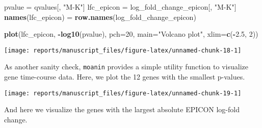 \documentclass[9pt,a4paper,]{extarticle}
\newenvironment{Shaded}{\begin{snugshade}}{\end{snugshade}}
\newcommand{\DataTypeTok}[1]{\textcolor[rgb]{0.13,0.29,0.53}{#1}}
\newcommand{\DecValTok}[1]{\textcolor[rgb]{0.00,0.00,0.81}{#1}}
\newcommand{\FloatTok}[1]{\textcolor[rgb]{0.00,0.00,0.81}{#1}}
\newcommand{\KeywordTok}[1]{\textcolor[rgb]{0.13,0.29,0.53}{\textbf{#1}}}
\newcommand{\NormalTok}[1]{#1}
\newcommand{\OperatorTok}[1]{\textcolor[rgb]{0.81,0.36,0.00}{\textbf{#1}}}
\newcommand{\OtherTok}[1]{\textcolor[rgb]{0.56,0.35,0.01}{#1}}
\newcommand{\StringTok}[1]{\textcolor[rgb]{0.31,0.60,0.02}{#1}}
\begin{document}
\begin{Shaded}
\begin{Highlighting}[]
\NormalTok{pvalue =}\StringTok{ }\NormalTok{qvalues[, }\StringTok{"M-K"}\NormalTok{]}
\NormalTok{lfc_epicon =}\StringTok{ }\NormalTok{log_fold_change_epicon[, }\StringTok{"M-K"}\NormalTok{]}
\KeywordTok{names}\NormalTok{(lfc_epicon) =}\StringTok{ }\KeywordTok{row.names}\NormalTok{(log_fold_change_epicon)}

\KeywordTok{plot}\NormalTok{(lfc_epicon, }\OperatorTok{-}\KeywordTok{log10}\NormalTok{(pvalue), }\DataTypeTok{pch=}\DecValTok{20}\NormalTok{, }\DataTypeTok{main=}\StringTok{"Volcano plot"}\NormalTok{,}
     \DataTypeTok{xlim=}\KeywordTok{c}\NormalTok{(}\OperatorTok{-}\FloatTok{2.5}\NormalTok{, }\DecValTok{2}\NormalTok{))}
\end{Highlighting}
\end{Shaded}

\begin{center}\texttt{[image: reports/manuscript\_files/figure-latex/unnamed-chunk-18-1]} \end{center}

As another sanity check, \texttt{moanin} provides a simple utility function to
visualize gene time-course data. Here, we plot the 12 genes with the smallest
p-values.

\begin{Shaded}
\end{Shaded}

\begin{center}\texttt{[image: reports/manuscript\_files/figure-latex/unnamed-chunk-19-1]} \end{center}

And here we visualize the genes with the largest absolute EPICON log-fold
change.

\begin{Shaded}
\end{Shaded}
\end{document}
